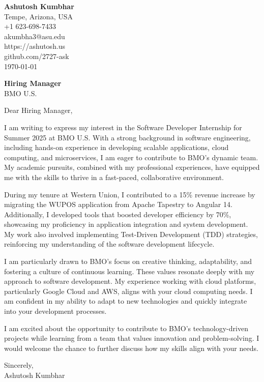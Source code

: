 \documentclass[11pt]{article}
\begin{document}
\begin{flushleft}
\textbf{Ashutosh Kumbhar} \\
Tempe, Arizona, USA \\
+1 623-698-7433 \\
akumbha3@asu.edu \\
https://ashutosh.us \\
github.com/2727-ask \\
\today
\end{flushleft}
\vspace{0.5em}
\textbf{Hiring Manager} \\
BMO U.S.
\vspace{1em}

Dear Hiring Manager,

I am writing to express my interest in the Software Developer Internship for Summer 2025 at BMO U.S. With a strong background in software engineering, including hands-on experience in developing scalable applications, cloud computing, and microservices, I am eager to contribute to BMO's dynamic team. My academic pursuits, combined with my professional experiences, have equipped me with the skills to thrive in a fast-paced, collaborative environment.

During my tenure at Western Union, I contributed to a 15\% revenue increase by migrating the WUPOS application from Apache Tapestry to Angular 14. Additionally, I developed tools that boosted developer efficiency by 70\%, showcasing my proficiency in application integration and system development. My work also involved implementing Test-Driven Development (TDD) strategies, reinforcing my understanding of the software development lifecycle.

I am particularly drawn to BMO's focus on creative thinking, adaptability, and fostering a culture of continuous learning. These values resonate deeply with my approach to software development. My experience working with cloud platforms, particularly Google Cloud and AWS, aligns with your cloud computing needs. I am confident in my ability to adapt to new technologies and quickly integrate into your development processes.

I am excited about the opportunity to contribute to BMO’s technology-driven projects while learning from a team that values innovation and problem-solving. I would welcome the chance to further discuss how my skills align with your needs.

Sincerely, \\
Ashutosh Kumbhar
\end{document}
